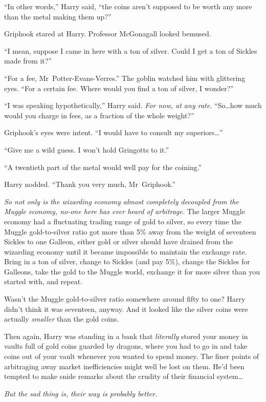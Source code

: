 “In other words,” Harry said, “the coins aren’t supposed to be worth any more than the metal making them up?”

Griphook stared at Harry. Professor McGonagall looked bemused.

“I mean, suppose I came in here with a ton of silver. Could I get a ton of Sickles made from it?”

“For a fee, Mr~Potter-Evans-Verres.” The goblin watched him with glittering eyes.
“For a certain fee. Where would you find a ton of silver, I wonder?”

“I was speaking hypothetically,” Harry said. \emph{For now, at any rate.}
“So…how much would you charge in fees, as a fraction of the whole weight?”

Griphook’s eyes were intent.
“I would have to consult my superiors…”

“Give me a wild guess. I won’t hold Gringotts to it.”

“A twentieth part of the metal would well pay for the coining.”

Harry nodded.
“Thank you very much, Mr~Griphook.”

\emph{So not only is the wizarding economy almost completely decoupled from the Muggle economy, no-one here has ever heard of arbitrage.} The larger Muggle economy had a fluctuating trading range of gold to silver, so every time the Muggle gold-to-silver ratio got more than 5\% away from the weight of seventeen Sickles to one Galleon, either gold or silver should have drained from the wizarding economy until it became impossible to maintain the exchange rate. Bring in a ton of silver, change to Sickles (and pay 5\%), change the Sickles for Galleons, take the gold to the Muggle world, exchange it for more silver than you started with, and repeat.

Wasn’t the Muggle gold-to-silver ratio somewhere around fifty to one? Harry didn’t think it was seventeen, anyway. And it looked like the silver coins were actually \emph{smaller} than the gold coins.

Then again, Harry was standing in a bank that \emph{literally} stored your money in vaults full of gold coins guarded by dragons, where you had to go in and take coins out of your vault whenever you wanted to spend money. The finer points of arbitraging away market inefficiencies might well be lost on them. He’d been tempted to make snide remarks about the crudity of their financial system…

\emph{But the sad thing is, their way is probably better.}


